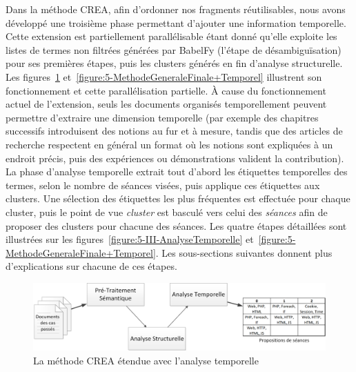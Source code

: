 Dans la méthode CREA, afin d'ordonner nos fragments réutilisables, nous avons développé une troisième phase permettant d'ajouter une information temporelle.
Cette extension est partiellement parallélisable étant donné qu'elle exploite les listes de termes non filtrées générées par BabelFy (l'étape de désambiguïsation) pour ses premières étapes, puis les clusters générés en fin d'analyse structurelle.
Les figures~\ref{figure:5-MethodeGenerale+Temporel} et~\ref{figure:5-MethodeGeneraleFinale+Temporel} illustrent son fonctionnement et cette parallélisation partielle.
À cause du fonctionnement actuel de l'extension, seuls les documents organisés temporellement peuvent permettre d'extraire une dimension temporelle (par exemple des chapitres successifs introduisent des notions au fur et à mesure, tandis que des articles de recherche respectent en général un format où les notions sont expliquées à un endroit précis, puis des expériences ou démonstrations valident la contribution).
La phase d'analyse temporelle extrait tout d'abord les étiquettes temporelles des termes, selon le nombre de séances visées, puis applique ces étiquettes aux clusters.
Une sélection des étiquettes les plus fréquentes est effectuée pour chaque cluster, puis le point de vue \textit{cluster} est basculé vers celui des \textit{séances} afin de proposer des clusters pour chacune des séances.
Les quatre étapes détaillées sont illustrées sur les figures~\ref{figure:5-III-AnalyseTemporelle} et~\ref{figure:5-MethodeGeneraleFinale+Temporel}.
Les sous-sections suivantes donnent plus d'explications sur chacune de ces étapes.

\hspace{0pt}
\vfill

\begin{figure}[ht]
\centering
\centerline{  %
\includegraphics[scale=0.6]{5-Conclusion/images/schema_general+temporel_ESCALIER.png}
}
\caption{La méthode CREA étendue avec l'analyse temporelle}
\label{figure:5-MethodeGenerale+Temporel}
\end{figure}


\bigskip


